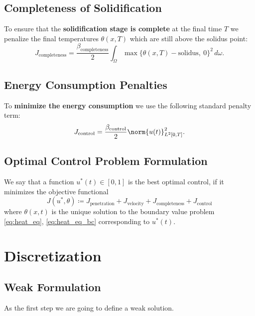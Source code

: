 \subsection{Completeness of Solidification}

To ensure that the \textbf{solidification stage is complete} at the final time $T$ we penalize the final temperatures $\theta(x, T)$ which are still above the solidus point:
\begin{equation}
	J_{\text{completeness}} =
	\frac{\beta_\text{completeness}}{2} \int_{\Omega} \max\{ \theta(x, T) - \text{solidus},\ 0 \}^2\, d\omega.
\end{equation}

\subsection{Energy Consumption Penalties}


To \textbf{minimize the energy consumption} we use the following standard penalty term:
\begin{equation}
	J_{\text{control}} =
	\frac{\beta_\text{control}}{2} \norm{u(t)}^2_{L^2[0,T]}.
\end{equation}



\subsection{Optimal Control Problem Formulation}

We say that a function $u^*(t) \in [0,1]$ is the best optimal control, if it minimizes the objective functional
\begin{equation} \label{eq:J}
	J(u^*, \theta) \coloneqq J_{\text{penetration}} + J_{\text{velocity}} + J_{\text{completeness}} + J_{\text{control}}
\end{equation}
where $\theta(x, t)$ is the unique solution to the boundary value problem \eqref{eq:heat_eq}, \eqref{eq:heat_eq_bc} corresponding to $u^*(t)$.


\section{Discretization}
\label{sec:discretization}

\subsection{Weak Formulation}
As the first step we are going to define a weak solution.

